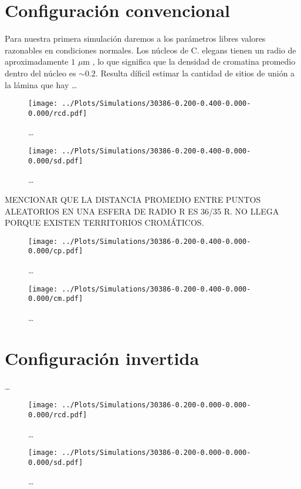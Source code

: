 \section{Configuración convencional}

Para nuestra primera simulación daremos a los parámetros libres valores razonables en condiciones normales. Los núcleos de C. elegans tienen un radio de aproximadamente $1$ $\mu$m \cite{Ikegami2010}, lo que significa que la densidad de cromatina promedio dentro del núcleo es $\sim 0.2$. Resulta díficil estimar la cantidad de sitios de unión a la lámina que hay \dots

\begin{figure}
    \centering
    \texttt{[image: ../Plots/Simulations/30386-0.200-0.400-0.000-0.000/rcd.pdf]}
    \caption{\dots}
    \label{fig:rcd_c}
\end{figure}

\begin{figure}
    \centering
    \texttt{[image: ../Plots/Simulations/30386-0.200-0.400-0.000-0.000/sd.pdf]}
    \caption{\dots}
    \label{fig:sd_c}
\end{figure}

MENCIONAR QUE LA DISTANCIA PROMEDIO ENTRE PUNTOS ALEATORIOS EN UNA ESFERA DE RADIO R ES 36/35 R. NO LLEGA PORQUE EXISTEN TERRITORIOS CROMÁTICOS.

\begin{figure}
    \centering
    \texttt{[image: ../Plots/Simulations/30386-0.200-0.400-0.000-0.000/cp.pdf]}
    \caption{\dots}
    \label{fig:cp_c}
\end{figure}

\begin{figure}
    \centering
    \texttt{[image: ../Plots/Simulations/30386-0.200-0.400-0.000-0.000/cm.pdf]}
    \caption{\dots}
    \label{fig:cm_c}
\end{figure}

\section{Configuración invertida}

\dots

\begin{figure}
    \centering
    \texttt{[image: ../Plots/Simulations/30386-0.200-0.000-0.000-0.000/rcd.pdf]}
    \caption{\dots}
    \label{fig:rcd_i}
\end{figure}

\begin{figure}
    \centering
    \texttt{[image: ../Plots/Simulations/30386-0.200-0.000-0.000-0.000/sd.pdf]}
    \caption{\dots}
    \label{fig:sd_i}
\end{figure}

